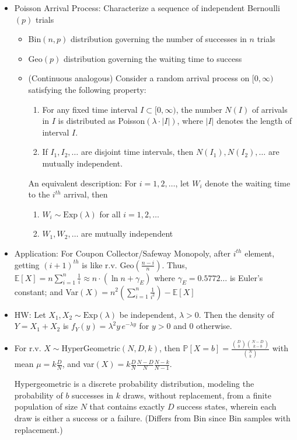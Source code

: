 \documentclass{article}
\begin{document}
\begin{itemize}
	\item {\color{blue} Poisson Arrival Process}: Characterize a sequence of independent Bernoulli$(p)$ trials
	\begin{itemize}
		\item Bin$(n, p)$ distribution governing the number of successes in $n$ trials
		\item Geo$(p)$ distribution governing the waiting time to success
		\item (Continuous analogous) Consider a random arrival process on $[0, \infty)$ satisfying the following property:
		\begin{enumerate}
			\item For any fixed time interval $I\subset [0,\infty)$, the number $N(I)$ of arrivals in $I$ is distributed as Poisson$(\lambda\cdot|I|)$, where $|I|$ denotes the length of interval $I$.
			\item If $I_1,I_2,\dots$ are disjoint time intervals, then $N(I_1),N(I_2),\dots$ are mutually independent.
		\end{enumerate}
		An equivalent description: For $i = 1, 2, \dots$, let $W_i$ denote the waiting time to the $i^{th}$ arrival, then
		\begin{enumerate}
			\item $W_i\sim\text{Exp}(\lambda)$ for all $i = 1,2,\dots$
			\item $W_1, W_2, \dots$ are mutually independent
		\end{enumerate}
	\end{itemize}
	\item Application: For Coupon Collector/Safeway Monopoly, after $i^{th}$ element, getting $(i+1)^{th}$ is like r.v. Geo$(\frac{n-i}{n})$. Thus, $\mathbb{E}[X] = n\sum\limits_{i=1}^{n} \frac{1}{i} \approx n\cdot(\ln n + \gamma_E)$ where $\gamma_E = 0.5772\dots$ is Euler's constant;
	and Var$(X) = n^2 (\sum\limits_{i=1}^{n} \frac{1}{i^2}) - \mathbb{E}[X]$
	\item HW: Let $X_1,X_2\sim \text{Exp}(\lambda)$ be independent, $\lambda > 0$. Then the density of $Y = X_1 + X_2$ is $f_Y(y) = \lambda^2 y\, e^{-\lambda y}$ for $y>0$ and 0 otherwise.

	\item For r.v. $X\sim\text{HyperGeometric}(N,D,k)$, then $\mathbb{P}[X=b] = \frac{\binom{D}{b}\binom{N-D}{k-b}}{\binom{N}{k}}$ with mean $\mu = k\frac{D}{N}$, and var$(X) = k\frac{D}{N}\frac{N-D}{N}\frac{N-k}{N-1}$.

	Hypergeometric is a discrete probability distribution, modeling the probability of $b$ successes in $k$ draws, without replacement, from a finite population of size $N$ that contains exactly $D$ success states, wherein each draw is either a success or a failure. (Differs from Bin since Bin samples with replacement.)
\end{itemize}
\end{document}
